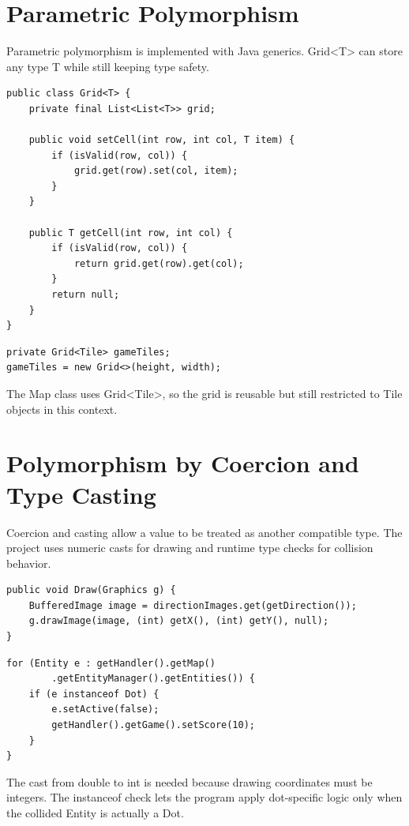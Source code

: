 \documentclass[12pt,a4paper]{article}
\begin{document}
\section*{Parametric Polymorphism}
Parametric polymorphism is implemented with Java generics. Grid<T> can store any type T while still keeping type safety.

\begin{lstlisting}
public class Grid<T> {
    private final List<List<T>> grid;

    public void setCell(int row, int col, T item) {
        if (isValid(row, col)) {
            grid.get(row).set(col, item);
        }
    }

    public T getCell(int row, int col) {
        if (isValid(row, col)) {
            return grid.get(row).get(col);
        }
        return null;
    }
}
\end{lstlisting}

\begin{lstlisting}
private Grid<Tile> gameTiles;
gameTiles = new Grid<>(height, width);
\end{lstlisting}

The Map class uses Grid<Tile>, so the grid is reusable but still restricted to Tile objects in this context.


\section*{Polymorphism by Coercion and Type Casting}
Coercion and casting allow a value to be treated as another compatible type. The project uses numeric casts for drawing and runtime type checks for collision behavior.

\begin{lstlisting}
public void Draw(Graphics g) {
    BufferedImage image = directionImages.get(getDirection());
    g.drawImage(image, (int) getX(), (int) getY(), null);
}
\end{lstlisting}

\begin{lstlisting}
for (Entity e : getHandler().getMap()
        .getEntityManager().getEntities()) {
    if (e instanceof Dot) {
        e.setActive(false);
        getHandler().getGame().setScore(10);
    }
}
\end{lstlisting}

The cast from double to int is needed because drawing coordinates must be integers. The instanceof check lets the program apply dot-specific logic only when the collided Entity is actually a Dot.
\end{document}

